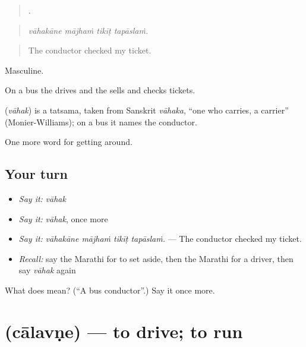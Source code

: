 \begin{quote}
   .
\end{quote}

\begin{quote}
\emph{vāhakāne mājhaṁ tikīṭ tapāslaṁ.}
\end{quote}

\begin{quote}
The conductor checked my ticket.
\end{quote}

Masculine.

On a bus the  drives and the  sells and checks tickets.

\begin{cousinweb}
\textbf{} (\emph{vāhak}) is a tatsama, taken from Sanskrit \emph{vāhaka}, \textquotedblleft{}one who carries, a carrier\textquotedblright{} (Monier-Williams); on a bus it names the conductor.
\end{cousinweb}

\begin{grammarlens}[title={What you've built}]
One more word for getting around.
\end{grammarlens}

\subsection*{Your turn}
\begin{itemize}
\raggedright
  \item \emph{Say it:} \emph{vāhak}
  \item \emph{Say it:} \emph{vāhak}, once more
  \item \emph{Say it:} \emph{vāhakāne mājhaṁ tikīṭ tapāslaṁ.} — The conductor checked my ticket.
  \item \emph{Recall:} say the Marathi for to set aside, then the Marathi for a driver, then say \emph{vāhak} again
\end{itemize}

\begin{tcolorbox}[breakable,colback=teal!4,colframe=teal!35!black,title={Before you move on}]
What does  mean? (\textquotedblleft{}A bus conductor\textquotedblright{}.) Say it once more.
\end{tcolorbox}
\section[\texorpdfstring{\mr{चालवणे} (cālavṇe)}{चालवणे (cālavṇe)}]{ (cālavṇe) — to drive; to run}

